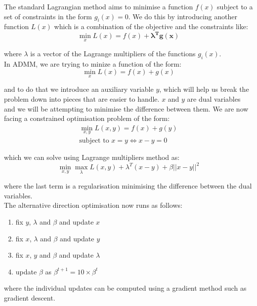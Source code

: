 \documentclass[a4paper, 12pt]{article}
\numberwithin{equation}{section}
\begin{document}
	The standard Lagrangian method aims to minimise a function $f(x)$ subject to a set of constraints in the form $g_i(x)=0$. We do this by introducing another function $L(x)$ which is a combination of the objective and the constraints like:
	\begin{equation}
	\min_{x} L(x) = f(x) + \boldsymbol{\lambda^T g(x)}
	\end{equation}
	
	where $\lambda$ is a vector of the Lagrange multipliers of the functions $g_i(x)$.\\
	
	In ADMM, we are trying to minize a function of the form:
	\begin{equation}
	\min_{x} L(x) = f(x) + g(x)
	\end{equation}
	
	and to do that we introduce an auxiliary variable $y$, which will help us break the problem down into pieces that are easier to handle. $x$ and $y$ are dual variables and we will be attempting to minimise the difference between them. We are now facing a constrained optimisation problem of the form:
	\begin{align}
	\min_{x,y} L(x,y) = f(x) + g(y) \\
	\textrm{subject to } x = y \Leftrightarrow x-y=0
	\end{align}
	
	which we can solve using Lagrange multipliers method as:
	\begin{equation}
	\label{ADMM_equation}
	\min_{x,y} \max_{\lambda} L(x,y) + \lambda^T (x-y) + \beta ||x-y||^2
	\end{equation}
	
	where the last term is a regularisation minimising the difference between the dual variables. \\
	
	The alternative direction optimisation now runs as follows:
	\begin{enumerate}
		\item fix $y$, $\lambda$ and $\beta$ and update $x$
		\item fix $x$, $\lambda$ and $\beta$ and update $y$
		\item fix $x$, $y$ and $\beta$ and update $\lambda$
		\item update $\beta$ as $\beta^{t+1}=10 \times \beta^{t}$
	\end{enumerate} 
	
	where the individual updates can be computed using a gradient method such as gradient descent.
	
\end{document}
